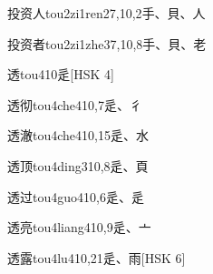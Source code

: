 \begin{EntryWithPhonetic}{投资人}{tou2zi1ren2}{7,10,2}{⼿、⾙、⼈}
\end{EntryWithPhonetic}

\begin{EntryWithPhonetic}{投资者}{tou2zi1zhe3}{7,10,8}{⼿、⾙、⽼}
\end{EntryWithPhonetic}

\begin{EntryWithPhonetic}{透}{tou4}{10}{⾡}[HSK 4]
\end{EntryWithPhonetic}

\begin{EntryWithPhonetic}{透彻}{tou4che4}{10,7}{⾡、⼻}
\end{EntryWithPhonetic}

\begin{EntryWithPhonetic}{透澈}{tou4che4}{10,15}{⾡、⽔}
\end{EntryWithPhonetic}

\begin{EntryWithPhonetic}{透顶}{tou4ding3}{10,8}{⾡、⾴}
\end{EntryWithPhonetic}

\begin{EntryWithPhonetic}{透过}{tou4guo4}{10,6}{⾡、⾡}
\end{EntryWithPhonetic}

\begin{EntryWithPhonetic}{透亮}{tou4liang4}{10,9}{⾡、⼇}
\end{EntryWithPhonetic}

\begin{EntryWithPhonetic}{透露}{tou4lu4}{10,21}{⾡、⾬}[HSK 6]
\end{EntryWithPhonetic}

